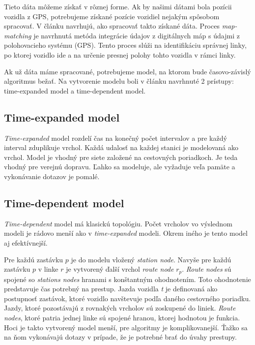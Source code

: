 Tieto dáta môžeme získať v rôznej forme. Ak by našimi dátami bola pozícii vozidla z GPS, potrebujeme získané pozície vozidiel nejakým spôsobom spracovať. V článku \cite{mapmatching} navrhujú, ako spracovať takto získané dáta. Proces \textit{map-matching} je navrhnutá metóda integrácie údajov z digitálnych máp s údajmi z polohovacieho systému (GPS). Tento proces slúži na identifikáciu správnej linky, po ktorej vozidlo ide a na určenie presnej polohy tohto vozidla v rámci linky.

Ak už dáta máme spracované, potrebujeme model, na ktorom bude časovo-závislý algoritmus bežať. Na vytvorenie modelu boli v článku \cite{models} navrhnuté 2 prístupy: time-expanded model a time-dependent model.

\subsection{Time-expanded model}
\label{sec:time-expanded-model}
\textit{Time-expanded} model rozdelí čas na konečný počet intervalov a pre každý interval zduplikuje vrchol. Každá udalosť na každej stanici je modelovaná ako vrchol. Model je vhodný pre siete založené na cestovných poriadkoch. Je teda vhodný pre verejnú dopravu. Ľahko sa modeluje, ale vyžaduje veľa pamäte a vykonávanie dotazov je pomalé.

\subsection{Time-dependent model}
\label{sec:time-dependant-model}
\textit{Time-dependent} model má klasickú topológiu. Počet vrcholov vo výslednom modeli je rádovo menší ako v \textit{time-expanded} modeli. Okrem iného je tento model aj efektívnejší. 

Pre každú zastávku $p$ je do modelu vložený \textit{station node}. Navyše pre každú zastávku $p$ v linke $r$ je vytvorený ďalší vrchol \textit{route node} $r_p$. \textit{Route nodes} sú spojené so \textit{stations nodes} hranami s konštantným ohodnotením. Toto ohodnotenie predstavuje čas potrebný na prestup. Jazda vozidla \textit{t} je definovaná ako postupnosť zastávok, ktoré vozidlo navštevuje podľa daného cestovného poriadku. Jazdy, ktoré pozostávajú z rovnakých vrcholov sú zoskupené do liniek. \textit{Route nodes}, ktoré patria jednej linke sú spojené hranou, ktorej hodnotou je funkcia. Hoci je takto vytvorený model menší, pre algoritmy je komplikovanejší. Ťažko sa na ňom vykonávajú dotazy v prípade, že je potrebné brať do úvahy prestupy.


